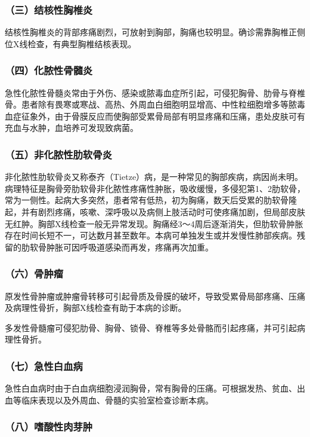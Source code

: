 \subsubsection{（三）结核性胸椎炎}

结核性胸椎炎的背部疼痛剧烈，可放射到胸部，胸痛也较明显。确诊需靠胸椎正侧位X线检查，有典型胸椎结核表现。

\subsubsection{（四）化脓性骨髓炎}

急性化脓性骨髓炎常由于外伤、感染或脓毒血症所引起，可侵犯胸骨、肋骨与脊椎骨。患者除有畏寒或寒战、高热、外周血白细胞明显增高、中性粒细胞增多等脓毒血症征象外，由于骨膜反应而使胸部受累骨局部有明显疼痛和压痛，患处皮肤可有充血与水肿，血培养可发现致病菌。

\subsubsection{（五）非化脓性肋软骨炎}

非化脓性肋软骨炎又称泰齐（Tietze）病，是一种常见的胸部疾病，病因尚未明。病理特征是胸骨旁肋软骨非化脓性疼痛性肿胀，吸收缓慢，多侵犯第1、2肋软骨，常为一侧性。起病大多突然，患者常有低热，初为胸痛，数天后受累的肋软骨隆起，并有剧烈疼痛，咳嗽、深呼吸以及病侧上肢活动时可使疼痛加剧，但局部皮肤无红肿。胸部X线检查一般无异常发现。胸痛经3～4周后逐渐消失，但肋软骨肿胀存在时间长短不一，可达数月甚至数年。本病可单独发生或并发慢性肺部疾病。残留的肋软骨肿胀可因呼吸道感染而再发，疼痛再次加重。

\subsubsection{（六）骨肿瘤}

原发性骨肿瘤或肿瘤骨转移可引起骨质及骨膜的破坏，导致受累骨局部疼痛、压痛及病理性骨折，胸部X线检查有助于本病的诊断。

多发性骨髓瘤可侵犯肋骨、胸骨、锁骨、脊椎等多处骨骼而引起疼痛，并可引起病理性骨折。

\subsubsection{（七）急性白血病}

急性白血病时由于白血病细胞浸润胸骨，常有胸骨的压痛。可根据发热、贫血、出血等临床表现以及外周血、骨髓的实验室检查诊断本病。

\subsubsection{（八）嗜酸性肉芽肿}

